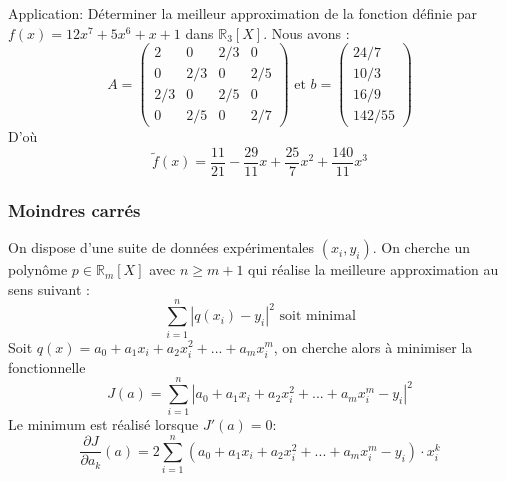 \documentclass{beamer}
\begin{document}
\begin{frame}
Application: Déterminer la meilleur approximation de la fonction définie par $f(x)=12 x^7+5 x^6+x+1$ dans $\mathbb{R}_3[X]$.
Nous avons :
\[A=\left(\begin{array}{cccc}
2& 0& 2/3& 0\\
0& 2/3& 0& 2/5\\
2/3& 0& 2/5& 0\\
0& 2/5& 0& 2/7
\end{array}\right)\mbox{ et }b=\left(\begin{array}{c}
24/7\\
10/3\\
16/9\\
142/55
\end{array}\right)
\]
D'où
\[\tilde{f}(x)= \frac{11}{21}-\frac{29}{11}x+\frac{25}{7}x^2+\frac{140}{11}x^3\]

\begin{center}
 \end{center}

\end{frame}

\begin{frame}
 \frametitle{Moindres carrés}
On dispose d'une suite de données expérimentales $(x_i, y_i)$. On
cherche un polynôme $p \in \mathbb{R}_m[X]$ avec $n \geq m+1$ qui réalise la meilleure approximation au sens suivant :
\[\sum_{i=1}^n\left|q(x_i)-y_i\right|^2\mbox{  soit minimal}\]
Soit $q(x) = a_0+a_1x_i+a_2x_i^2+...+a_mx_i^m$, on cherche alors à minimiser la fonctionnelle
\[J(a) = \sum_{i=1}^n|a_0+a_1x_i+a_2x_i^2+...+a_mx_i^m-y_i|^2\]
Le minimum est réalisé lorsque $J'(a)=0$:
\[\frac{\partial J}{\partial a_k}(a) = 2\sum_{i=1}^n\left(a_0+a_1x_i+a_2x_i^2+...+a_mx_i^m-y_i\right)\cdot x_i^k\]

\end{frame}
\end{document}

